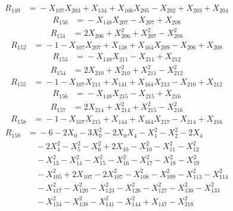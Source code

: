 \[\begin{aligned}
R_{149} &={}-X_{107}X_{203} + X_{134} + X_{166}X_{205} - X_{202} + X_{203} + X_{204}
\end{aligned}\]
\[\begin{aligned}
R_{150} &={}-X_{148}X_{207} - X_{207} + X_{208}
\end{aligned}\]
\[\begin{aligned}
R_{151} &={}2X_{206} + X_{206}^{2} + X_{207}^{2} - X_{208}^{2}
\end{aligned}\]
\[\begin{aligned}
R_{152} &={}-1 - X_{107}X_{207} + X_{138} + X_{164}X_{209} - X_{206} + X_{208}
\end{aligned}\]
\[\begin{aligned}
R_{153} &={}-X_{148}X_{211} - X_{211} + X_{212}
\end{aligned}\]
\[\begin{aligned}
R_{154} &={}2X_{210} + X_{210}^{2} + X_{211}^{2} - X_{212}^{2}
\end{aligned}\]
\[\begin{aligned}
R_{155} &={}-1 - X_{107}X_{211} + X_{141} + X_{164}X_{213} - X_{210} + X_{212}
\end{aligned}\]
\[\begin{aligned}
R_{156} &={}-X_{148}X_{215} - X_{215} + X_{216}
\end{aligned}\]
\[\begin{aligned}
R_{157} &={}2X_{214} + X_{214}^{2} + X_{215}^{2} - X_{216}^{2}
\end{aligned}\]
\[\begin{aligned}
R_{158} &={}-1 - X_{107}X_{215} + X_{144} + X_{164}X_{217} - X_{214} + X_{216}
\end{aligned}\]
\[\begin{aligned}
R_{159} &={}-6 - 2X_{0} - 3X_{0}^{2} - 2X_{0}X_{4} - X_{1}^{2} - X_{2}^{2} - 2X_{4}\\
&\quad{} - 2X_{4}^{2} - X_{5}^{2} - X_{6}^{2} + 2X_{10} - X_{10}^{2} - X_{11}^{2} - X_{12}^{2}\\
&\quad{} - X_{13}^{2} - X_{14}^{2} - X_{15}^{2} - X_{16}^{2} - X_{17}^{2} - X_{18}^{2} - X_{19}^{2}\\
&\quad{} - X_{105}^{2} + 2X_{107} - 2X_{107}^{2} - X_{108}^{2} - X_{109}^{2} - X_{113}^{2} - X_{114}^{2}\\
&\quad{} - X_{117}^{2} - X_{120}^{2} - X_{123}^{2} - X_{126}^{2} - X_{127}^{2} - X_{130}^{2} - X_{133}^{2}\\
&\quad{} - X_{134}^{2} - X_{138}^{2} - X_{141}^{2} - X_{144}^{2} + X_{147} - X_{218}^{2}
\end{aligned}\]
